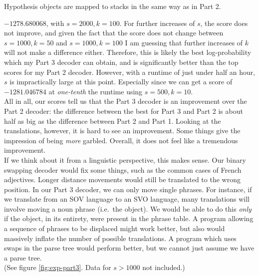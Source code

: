 \documentclass[answers]{exam}
\begin{document}
\begin{questions}
\begin{framed}
  Hypothesis objects are mapped to stacks in the same way as in Part 2.
\end{framed}


\addtocounter{question}{1}
\begin{framed}
  $-1278.680068$, with $s = 2000, k = 100$. For further increases of $s$,
  the score does not improve, and given the fact that the score does not change
  between $s = 1000, k = 50$ and $s = 1000, k = 100$ I am guessing that further
  increases of $k$ will not make a difference either.
  Therefore, this is likely the best log-probability which my Part 3 decoder can
  obtain, and is significantly better than the top scores for my Part 2 decoder.
  However, with a runtime of just under half an hour, $s$ is impractically large
  at this point. Especially since we can get a score of $-1281.046784$ at
  \emph{one-tenth} the runtime using $s = 500, k = 10$. 
  \\
  All in all, our scores tell us that the Part 3 decoder is an improvement over
  the Part 2 decoder: the difference between the best for Part 3 and Part 2 is
  about half as big as the difference between Part 2 and Part 1. Looking at the
  translations, however, it is hard to see an improvement. Some things give the
  impression of being \emph{more} garbled. Overall, it does not feel like a
  tremendous improvement. 
  \\
  If we think about it from a linguistic perspective, this makes sense. Our
  binary swapping decoder would fix some things, such as the common cases of
  French adjectives. Longer distance movements would still be translated to the
  wrong position.
  In our Part 3 decoder, we can only move single phrases. For instance, if we
  translate from an SOV language to an SVO language, many translations will
  involve moving a noun phrase (i.e.\ the object). We would be able to do this
  \emph{only} if the object, in its entirety, were present in the phrase table.
  A program allowing a sequence of phrases to be displaced might work better,
  but also would massively inflate the number of possible translations. A
  program which uses swaps in the parse tree would perform better, but we cannot
  just assume we have a parse tree. 
  \\
  (See figure \ref{fig:exp-part3}. Data for $s > 1000$ not included.)
\end{framed}
\end{questions}
\end{document}
